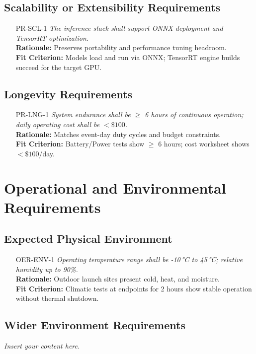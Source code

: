 \documentclass[12pt]{article}
\newcommand{\lips}{\textit{Insert your content here.}}
\begin{document}
\subsection{Scalability or Extensibility Requirements}
\begin{itemize}[leftmargin=*]
  \item[PR-SCL-1] \emph{The inference stack shall support ONNX deployment and TensorRT optimization.}\\
  \textbf{Rationale:} Preserves portability and performance tuning headroom.\\
  \textbf{Fit Criterion:} Models load and run via ONNX; TensorRT engine builds succeed for the target GPU.
\end{itemize}
\subsection{Longevity Requirements}
\begin{itemize}[leftmargin=*]
  \item[PR-LNG-1] \emph{System endurance shall be $\geq$ 6 hours of continuous operation; daily operating cost shall be $<\$100$.}\\
  \textbf{Rationale:} Matches event-day duty cycles and budget constraints.\\
  \textbf{Fit Criterion:} Battery/Power tests show $\geq$ 6 hours; cost worksheet shows $<\$100$/day.
\end{itemize}

\section{Operational and Environmental Requirements}

\subsection{Expected Physical Environment}
\begin{itemize}[leftmargin=*]
  \item[OER-ENV-1] \emph{Operating temperature range shall be -10\,°C to 45\,°C; relative humidity up to 90\%.}\\
  \textbf{Rationale:} Outdoor launch sites present cold, heat, and moisture.\\
  \textbf{Fit Criterion:} Climatic tests at endpoints for 2 hours show stable operation without thermal shutdown.
\end{itemize}
\subsection{Wider Environment Requirements}
\lips
\end{document}
